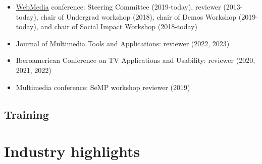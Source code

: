 \documentclass[10pt,a4paper,sans,colorlinks]{moderncv}
\begin{document}
    \begin{itemize}[mynosep]
      \item\href{http://www.webmedia.org.br}{WebMedia} conference: Steering Committee (2019-today), reviewer (2013-today), \newline chair of Undergrad workshop (2018), chair of Demos Workshop (2019-today), and \newline chair of Social Impact Workshop (2018-today)
    \end{itemize}

    \begin{itemize}[mynosep]
      \item Journal of Multimedia Tools and Applications: reviewer (2022, 2023)
      \item Iberoamerican Conference on TV Applications and Usability: reviewer (2020, 2021, 2022)
    \end{itemize}

    \begin{itemize}[mynosep]
      \item Multimedia conference: SeMP workshop reviewer (2019)
    \end{itemize}

    \subsection{Training}


\section{Industry highlights}
\end{document}
